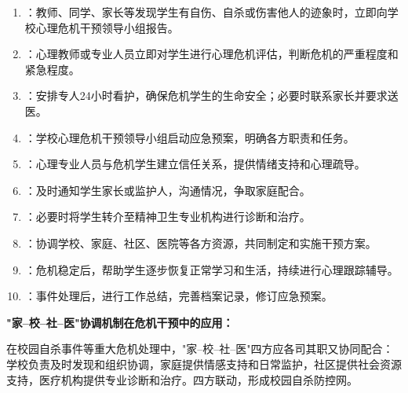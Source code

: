 \begin{keybox}
\begin{enumerate}[leftmargin=*]
    \item {}：教师、同学、家长等发现学生有自伤、自杀或伤害他人的迹象时，立即向学校心理危机干预领导小组报告。
    \item {}：心理教师或专业人员立即对学生进行心理危机评估，判断危机的严重程度和紧急程度。
    \item {}：安排专人24小时看护，确保危机学生的生命安全；必要时联系家长并要求送医。
    \item {}：学校心理危机干预领导小组启动应急预案，明确各方职责和任务。
    \item {}：心理专业人员与危机学生建立信任关系，提供情绪支持和心理疏导。
    \item {}：及时通知学生家长或监护人，沟通情况，争取家庭配合。
    \item {}：必要时将学生转介至精神卫生专业机构进行诊断和治疗。
    \item {}：协调学校、家庭、社区、医院等各方资源，共同制定和实施干预方案。
    \item {}：危机稳定后，帮助学生逐步恢复正常学习和生活，持续进行心理跟踪辅导。
    \item {}：事件处理后，进行工作总结，完善档案记录，修订应急预案。
\end{enumerate}

\textbf{"家--校--社--医"协调机制在危机干预中的应用：}

在校园自杀事件等重大危机处理中，"家--校--社--医"四方应各司其职又协同配合：学校负责及时发现和组织协调，家庭提供情感支持和日常监护，社区提供社会资源支持，医疗机构提供专业诊断和治疗。四方联动，形成校园自杀防控网。
\end{keybox}

\newpage
